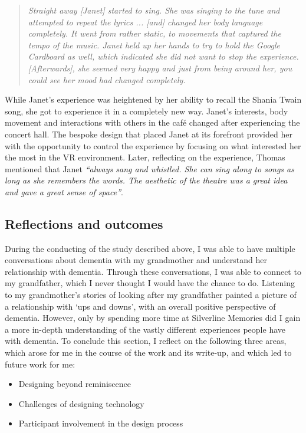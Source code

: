 \begin{quote}
\textit{Straight away [Janet] started to sing. She was singing to the tune and attempted to repeat the lyrics ... [and] changed her body language completely. It went from rather static, to movements that captured the tempo of the music. Janet held up her hands to try to hold the Google Cardboard as well, which indicated she did not want to stop the experience. [Afterwards], she seemed very happy and just from being around her, you could see her mood had changed completely.}    
\end{quote}

While Janet’s experience was heightened by her ability to recall the Shania Twain song, she got to experience it in a completely new way. Janet’s interests, body movement and interactions with others in the café changed after experiencing the concert hall. The bespoke design that placed Janet at its forefront provided her with the opportunity to control the experience by focusing on what interested her the most in the VR environment. Later, reflecting on the experience, Thomas mentioned that Janet \textit{``always sang and whistled. She can sing along to songs as long as she remembers the words. The aesthetic of the theatre was a great idea and gave a great sense of space''}.

\subsection{Reflections and outcomes}
\label{S1:ReflectionsOutcomes}
During the conducting of the study described above, I was able to have multiple conversations about dementia with my grandmother and understand her relationship with dementia. Through these conversations, I was able to connect to my grandfather, which I never thought I would have the chance to do. Listening to my grandmother's stories of looking after my grandfather painted a picture of a relationship with `ups and downs', with an overall positive perspective of dementia. However, only by spending more time at Silverline Memories did I gain a more in-depth understanding of the vastly different experiences people have with dementia. To conclude this section, I reflect on the following three areas, which arose for me in the course of the work and its write-up, and which led to future work for me:
\begin{itemize}
    \item Designing beyond reminiscence
    \item Challenges of designing technology
    \item Participant involvement in the design process
\end{itemize}

